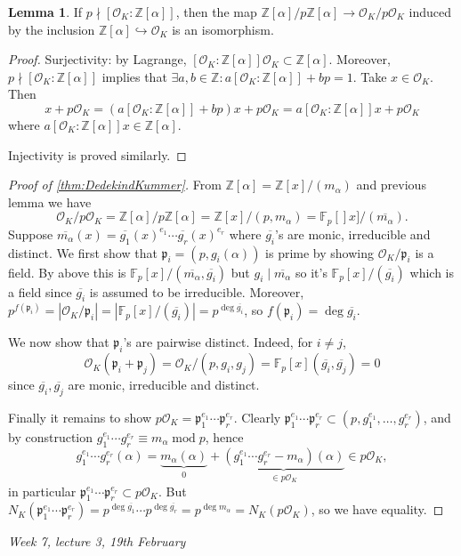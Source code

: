 \documentclass{article}
\newcommand{\Z}{\mathbb{Z}}
\newcommand{\F}{\mathbb{F}}
\newcommand{\Mod}{\operatorname{mod}}
\newcommand{\ri}{\mathcal{O}}
\newcommand{\ip}{\mathfrak{p}}
\theoremstyle{definition}
\newtheorem{lemma}[defn]{Lemma}
\begin{document}
\begin{lemma}
If $p\nmid [\ri_K:\Z[\alpha]]$, then the map $\Z[\alpha]/p\Z[\alpha]\rightarrow\ri_K/p\ri_K$ induced by the inclusion $\Z[\alpha]\hookrightarrow\ri_K$ is an isomorphism.
\end{lemma}
\begin{proof}
Surjectivity: by Lagrange, $[\ri_K:\Z[\alpha]]\ri_K\subset\Z[\alpha]$. Moreover, $p\nmid[\ri_K:\Z[\alpha]]$ implies that $\exists a,b\in\Z:a[\ri_K:\Z[\alpha]]+bp=1$. Take $x\in\ri_K$. Then
\[
x+p\ri_K=(a[\ri_K:\Z[\alpha]]+bp)x+p\ri_K=a[\ri_K:\Z[\alpha]]x+p\ri_K
\]
where $a[\ri_K:\Z[\alpha]]x\in\Z[\alpha]$.

Injectivity is proved similarly.
\end{proof}

\begin{proof}[Proof of \ref{thm:DedekindKummer}]
From $\Z[\alpha]=\Z[x]/(m_\alpha)$ and previous lemma we have
\[
\ri_K/p\ri_K=\Z[\alpha]/p\Z[\alpha]=\Z[x]/(p,m_\alpha)=\F_p[]x]/(\overline{m_\alpha}).
\]
Suppose $\overline{m_\alpha}(x)=\overline{g_1}(x)^{e_1}\cdots\overline{g_r}(x)^{e_r}$ where $\overline{g_i}$'s are monic, irreducible and distinct. We first show that $\ip_i=(p,g_i(\alpha))$ is prime by showing $\ri_K/\ip_i$ is a field. By above this is $\F_p[x]/(\overline{m_\alpha},\overline{g_i})$ but $g_i\mid\overline{m_\alpha}$ so it's $\F_p[x]/(\overline{g_i})$ which is a field since $\overline{g_i}$ is assumed to be irreducible. Moreover, $p^{f(\ip_i)}=|\ri_K/\ip_i|=|\F_p[x]/(\overline{g_i})|=p^{\deg\overline{g_i}}$, so $f(\ip_i)=\deg\overline{g_i}$.

We now show that $\ip_i$'s are pairwise distinct. Indeed, for $i\neq j$,
\[
\ri_K(\ip_i+\ip_j)=\ri_K/(p,g_i,g_j)=\F_p[x](\overline{g_i},\overline{g_j})=0
\]
since $\overline{g_i},\overline{g_j}$ are monic, irreducible and distinct.

Finally it remains to show $p\ri_K=\ip_1^{e_1}\cdots\ip_r^{e_r}$. Clearly $\ip_1^{e_1}\cdots\ip_r^{e_r}\subset (p,g_1^{e_1},\ldots,g_r^{e_r})$, and by construction $g_1^{e_1}\cdots g_r^{e_r}\equiv m_\alpha\Mod p$, hence
\[
g_1^{e_1}\cdots g_r^{e_r}(\alpha)=\underbrace{m_\alpha(\alpha)}_0+\underbrace{(g_1^{e_1}\cdots g_r^{e_r}-m_\alpha)(\alpha)}_{\in p\ri_K}\in p\ri_K,
\]
in particular $\ip_1^{e_1}\cdots\ip_r^{e_r}\subset p\ri_K$. But $N_K(\ip_1^{e_1}\cdots\ip_r^{e_r})=p^{\deg\overline{g_1}}\cdots p^{\deg\overline{g_r}}=p^{\deg m_\alpha}=N_K(p\ri_K)$, so we have equality.
\end{proof}

\begin{flushright}
\textit{Week 7, lecture 3, 19th February}
\end{flushright}
\end{document}
